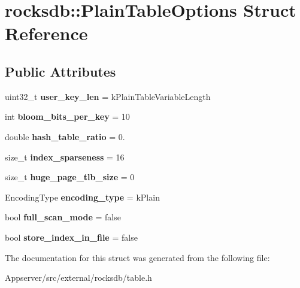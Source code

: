\hypertarget{structrocksdb_1_1PlainTableOptions}{}\section{rocksdb\+:\+:Plain\+Table\+Options Struct Reference}
\label{structrocksdb_1_1PlainTableOptions}
\subsection*{Public Attributes}
\begin{DoxyCompactItemize}
\item 
uint32\+\_\+t {\bfseries user\+\_\+key\+\_\+len} = k\+Plain\+Table\+Variable\+Length\hypertarget{structrocksdb_1_1PlainTableOptions_a6d033f071f8843eccd43457bb69863de}{}\label{structrocksdb_1_1PlainTableOptions_a6d033f071f8843eccd43457bb69863de}

\item 
int {\bfseries bloom\+\_\+bits\+\_\+per\+\_\+key} = 10\hypertarget{structrocksdb_1_1PlainTableOptions_a3eee69ca32c8046d65b2072e78adae5c}{}\label{structrocksdb_1_1PlainTableOptions_a3eee69ca32c8046d65b2072e78adae5c}

\item 
double {\bfseries hash\+\_\+table\+\_\+ratio} = 0.\hypertarget{structrocksdb_1_1PlainTableOptions_ad7ba4c41f318b6df711a9b3b99982d35}{}\label{structrocksdb_1_1PlainTableOptions_ad7ba4c41f318b6df711a9b3b99982d35}

\item 
size\+\_\+t {\bfseries index\+\_\+sparseness} = 16\hypertarget{structrocksdb_1_1PlainTableOptions_ac6cedd6bf5bd2c707bd1ebb11958ddc5}{}\label{structrocksdb_1_1PlainTableOptions_ac6cedd6bf5bd2c707bd1ebb11958ddc5}

\item 
size\+\_\+t {\bfseries huge\+\_\+page\+\_\+tlb\+\_\+size} = 0\hypertarget{structrocksdb_1_1PlainTableOptions_add296e65ac19217093b85f3f6df0c380}{}\label{structrocksdb_1_1PlainTableOptions_add296e65ac19217093b85f3f6df0c380}

\item 
Encoding\+Type {\bfseries encoding\+\_\+type} = k\+Plain\hypertarget{structrocksdb_1_1PlainTableOptions_a58e84a7af9a0faab3c06c0d4b967afb3}{}\label{structrocksdb_1_1PlainTableOptions_a58e84a7af9a0faab3c06c0d4b967afb3}

\item 
bool {\bfseries full\+\_\+scan\+\_\+mode} = false\hypertarget{structrocksdb_1_1PlainTableOptions_a50f67b78797d2cc231889a403e5b7154}{}\label{structrocksdb_1_1PlainTableOptions_a50f67b78797d2cc231889a403e5b7154}

\item 
bool {\bfseries store\+\_\+index\+\_\+in\+\_\+file} = false\hypertarget{structrocksdb_1_1PlainTableOptions_a1f771cd742a3bbdb9d658db23ac1f90d}{}\label{structrocksdb_1_1PlainTableOptions_a1f771cd742a3bbdb9d658db23ac1f90d}

\end{DoxyCompactItemize}


The documentation for this struct was generated from the following file\+:\begin{DoxyCompactItemize}
\item 
Appserver/src/external/rocksdb/table.\+h\end{DoxyCompactItemize}
